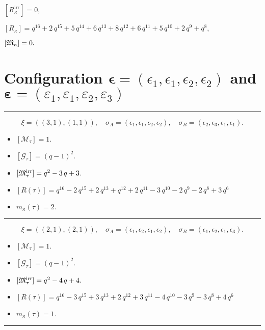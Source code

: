 \documentclass[10pt,a4paper]{amsart}
\begin{document}
${[R_{\kappa}^{\textrm{irr}}]} = 0 ,$

${[R_{\kappa}]} = q^{16} + 2 \, q^{15} + 5 \, q^{14} + 6 \, q^{13} + 8 \, q^{12} + 6 \, q^{11} + 5 \, q^{10} + 2 \, q^{9} + q^{8} ,$

${[{\frak M}_{\kappa}]} = 0 .$

\newpage{}

\section{Configuration $\bm{\epsilon} = (\epsilon_1,\epsilon_1,\epsilon_2,\epsilon_2)$ and $\bm{\varepsilon} =(\varepsilon_1,\varepsilon_1,\varepsilon_2,\varepsilon_3)$}
\noindent\rule{8cm}{0.4pt}

$$\xi = ({(3, 1), (1, 1)}),\quad \sigma_A = ({{\epsilon_1, \epsilon_1, \epsilon_2}, {\epsilon_2}}),\quad \sigma_B = ({{\epsilon_2, \epsilon_3, \epsilon_1}, {\epsilon_1}}).$$

\begin{itemize}
 \item $[\mathcal{M}_{\tau}] = 1 .$

 \item $[\mathcal{G}_{\tau}] = {\left(q - 1\right)}^{2} .$

 \item $[{\frak M}_{\tau}^{\textrm{irr}}] = q^{2} - 3 \, q + 3 .$

 \item $[R(\tau)] = q^{16} - 2 \, q^{15} + 2 \, q^{13} + q^{12} + 2 \, q^{11} - 3 \, q^{10} - 2 \, q^{9} - 2 \, q^{8} + 3 \, q^{6} $

 \item $m_{\kappa}(\tau) = 2 .$

 \end{itemize}
\noindent\rule{8cm}{0.4pt}

$$\xi = ({(2, 1), (2, 1)}),\quad \sigma_A = ({{\epsilon_1, \epsilon_2}, {\epsilon_1, \epsilon_2}}),\quad \sigma_B = ({{\epsilon_1, \epsilon_2}, {\epsilon_1, \epsilon_3}}).$$

\begin{itemize}
 \item $[\mathcal{M}_{\tau}] = 1 .$

 \item $[\mathcal{G}_{\tau}] = {\left(q - 1\right)}^{2} .$

 \item $[{\frak M}_{\tau}^{\textrm{irr}}] = q^{2} - 4 \, q + 4 .$

 \item $[R(\tau)] = q^{16} - 3 \, q^{15} + 3 \, q^{13} + 2 \, q^{12} + 3 \, q^{11} - 4 \, q^{10} - 3 \, q^{9} - 3 \, q^{8} + 4 \, q^{6} $

 \item $m_{\kappa}(\tau) = 1 .$

 \end{itemize}
\noindent\rule{8cm}{0.4pt}
\end{document}
